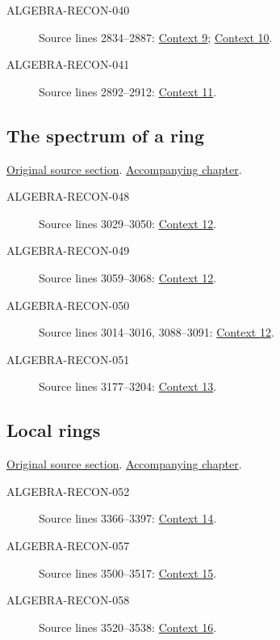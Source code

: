 \begin{description}
\item[ALGEBRA-RECON-040] Source lines 2834--2887: \hyperlink{algebra-context-009}{Context 9}; \hyperlink{algebra-context-010}{Context 10}.
\item[ALGEBRA-RECON-041] Source lines 2892--2912: \hyperlink{algebra-context-011}{Context 11}.
\end{description}

\subsection{The spectrum of a ring}
\hypertarget{algebra-source-section-spectrum-ring}{}
\noindent\href{https://github.com/stacks/stacks-project/blob/a04446e57ec1fbc252a871afcec7752fb2807b14/algebra.tex\#L2964}{Original source section}. \href{algebra.pdf\#nameddest=section-spectrum-ring}{Accompanying chapter}.

\begin{description}
\item[ALGEBRA-RECON-048] Source lines 3029--3050: \hyperlink{algebra-context-012}{Context 12}.
\item[ALGEBRA-RECON-049] Source lines 3059--3068: \hyperlink{algebra-context-012}{Context 12}.
\item[ALGEBRA-RECON-050] Source lines 3014--3016, 3088--3091: \hyperlink{algebra-context-012}{Context 12}.
\item[ALGEBRA-RECON-051] Source lines 3177--3204: \hyperlink{algebra-context-013}{Context 13}.
\end{description}

\subsection{Local rings}
\hypertarget{algebra-source-section-local-rings}{}
\noindent\href{https://github.com/stacks/stacks-project/blob/a04446e57ec1fbc252a871afcec7752fb2807b14/algebra.tex\#L3305}{Original source section}. \href{algebra.pdf\#nameddest=section-local-rings}{Accompanying chapter}.

\begin{description}
\item[ALGEBRA-RECON-052] Source lines 3366--3397: \hyperlink{algebra-context-014}{Context 14}.
\item[ALGEBRA-RECON-057] Source lines 3500--3517: \hyperlink{algebra-context-015}{Context 15}.
\item[ALGEBRA-RECON-058] Source lines 3520--3538: \hyperlink{algebra-context-016}{Context 16}.
\end{description}

